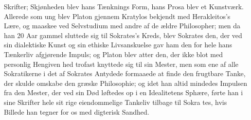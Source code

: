 \documentclass[12pt,a4paper]{book}
\begin{document}
Skrifter; Skjønheden blev hans Tænknings Form, hans Prosa
blev et Kunstværk. Allerede som ung blev Platon gjennem
Kratylos bekjendt med Herakleitos's Lære, og maaskee ved
Selvstudium med andre af de ældre Philosopher; men da han
20 Aar gammel sluttede sig til Sokrates's Kreds, blev Sokrates
den, der ved sin dialektiske Kunst og sin ethiske Livsanskuelse
gav ham den for hele hans Tænkerliv afgjørende Impuls; og
Platon blev atter den, der ikke blot med personlig Hengiven\-%
hed trofast knyttede sig til sin Mester, men som ene af alle
Sokratikerne i det af Sokrates Antydede formaaede at finde den
frugtbare Tanke, der skulde omskabe den græske Philosophie;
og idet han altid mindedes Impulsen fra den Mester, der ved
sin Død løftedes op i en Idealitetens Sphære, førte han i sine
Skrifter hele sit rige eiendommelige Tankeliv tilbage til Sokra\-%
tes, hvis Billede han tegner for os med digterisk Sandhed.
\end{document}

